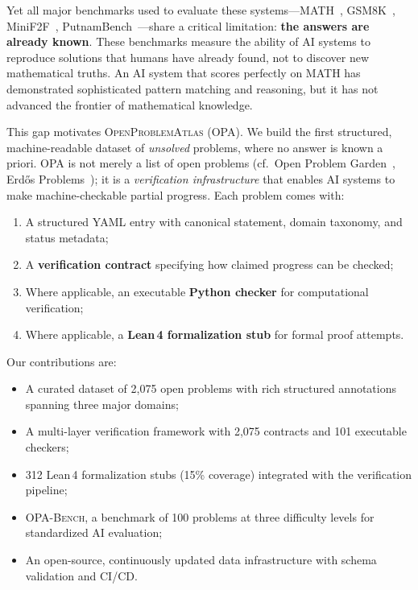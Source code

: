 \documentclass[11pt]{article}
\begin{document}
Yet all major benchmarks used to evaluate these systems---MATH~\citep{hendrycks2021math}, GSM8K~\citep{cobbe2021gsm8k}, MiniF2F~\citep{zheng2022minif2f}, PutnamBench~\citep{tsoukalas2024putnambench}---share a critical limitation: \textbf{the answers are already known}.
These benchmarks measure the ability of AI systems to reproduce solutions that humans have already found, not to discover new mathematical truths.
An AI system that scores perfectly on MATH has demonstrated sophisticated pattern matching and reasoning, but it has not advanced the frontier of mathematical knowledge.

This gap motivates \textsc{OpenProblemAtlas} (OPA).
We build the first structured, machine-readable dataset of \emph{unsolved} problems, where no answer is known a priori.
OPA is not merely a list of open problems (cf.\ Open Problem Garden~\citep{openproblemgarden}, Erd\H{o}s Problems~\citep{erdosproblems}); it is a \emph{verification infrastructure} that enables AI systems to make machine-checkable partial progress.
Each problem comes with:
\begin{enumerate}  \item A structured YAML entry with canonical statement, domain taxonomy, and status metadata;
  \item A \textbf{verification contract} specifying how claimed progress can be checked;
  \item Where applicable, an executable \textbf{Python checker} for computational verification;
  \item Where applicable, a \textbf{Lean\,4 formalization stub} for formal proof attempts.
\end{enumerate}

Our contributions are:
\begin{itemize}  \item A curated dataset of 2{,}075 open problems with rich structured annotations spanning three major domains;
  \item A multi-layer verification framework with 2{,}075 contracts and 101 executable checkers;
  \item 312 Lean\,4 formalization stubs (15\% coverage) integrated with the verification pipeline;
  \item \textsc{OPA-Bench}, a benchmark of 100 problems at three difficulty levels for standardized AI evaluation;
  \item An open-source, continuously updated data infrastructure with schema validation and CI/CD.
\end{itemize}
\end{document}
